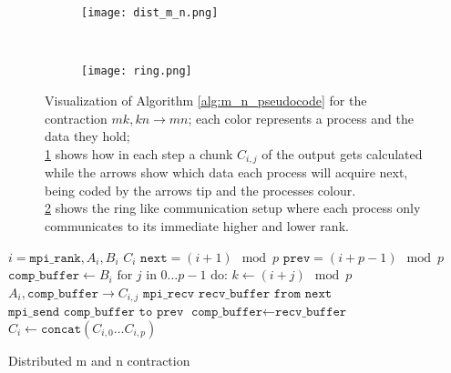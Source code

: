 \begin{figure}[ht]
    \centering
    \begin{subfigure}[t]{0.7\textwidth}
        \centering
        \texttt{[image: dist\_m\_n.png]}
        \label{fig:m_n_algo_a}
    \end{subfigure}
    ~
    \begin{subfigure}[t]{0.25\textwidth}
        \centering\texttt{[image: ring.png]}
        \label{fig:m_n_algo_b}
    \end{subfigure}
    
    \caption{Visualization of Algorithm \ref{alg:m_n_pseudocode} for the contraction $mk,kn\rightarrow mn$; 
    each color represents a process and the data they hold;\\
    \ref{fig:m_n_algo_a} shows how in each step a chunk $C_{i,j}$ of the output gets calculated while the arrows show which data each process will acquire next, being coded by the arrows tip and the processes colour.\\
    \ref{fig:m_n_algo_b} shows the ring like communication setup where each process only communicates to its immediate higher and lower rank.
    }
    \label{fig:m_n_algo}
\end{figure}
    

\begin{algorithm}[ht]
        \begin{algorithmic}
        \Require $i = \texttt{mpi\_rank}, A_i, B_i$
        \Ensure $C_i$
        \State $\texttt{next} = (i+1) \mod p$
        \State $\texttt{prev} = (i+p-1) \mod p$
        \State $\texttt{comp\_buffer} \gets B_i$
        \State  $\text{for } j \text{ in } 0\dots p - 1 \text{ do:}$
        \State \indent $k \gets (i + j) \mod p$
        \State \indent {}
        \State \indent \indent $A_i, \texttt{comp\_buffer} \rightarrow C_{i,j}$
        \State \indent \indent $\texttt{mpi\_recv recv\_buffer from next}$
        \State \indent \indent $\texttt{mpi\_send comp\_buffer to prev}$
        \State \indent $\texttt{comp\_buffer} \gets \texttt{recv\_buffer}$
        \State $C_i \gets \texttt{concat}(C_{i,0}\dots C_{i,p})$
    \end{algorithmic}
    \caption{Distributed m and n contraction}
    \label{alg:m_n_pseudocode}
\end{algorithm}

